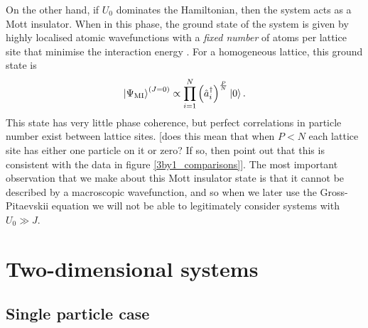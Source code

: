 \documentclass[a4paper, 10pt]{article}
\theoremstyle{plain}
\begin{document}
On the other hand, if $U_{0}$ dominates the Hamiltonian, then the
system acts as a Mott insulator. When in this phase, the
ground state of the system is given by highly localised atomic wavefunctions
with a \emph{fixed number} of atoms per lattice site that minimise the
interaction energy \cite{Bloch2005}. For a homogeneous lattice, this ground
state is
\begin{equation}
    \ket{\Psi_{\text{MI}}}^{\left(J=0\right)}
    \propto
    \prod_{i=1}^N \left( \hat{a}_i^\dagger \right)^\frac{P}{N}
    \ket{0}.
\end{equation}
This state has very little phase coherence, but perfect correlations in particle
number exist between lattice sites. [does this mean
that when $P<N$ each lattice site has either one particle on it or zero? If so,
then point out that this is consistent with the data in figure
\ref{3by1_comparisons}]. The most important observation that we make about this
Mott insulator state is that it cannot be described by a macroscopic
wavefunction, and so when we later use the Gross-Pitaevskii equation we will
not be able to legitimately consider systems with $U_{0} \gg J$.


\section{Two-dimensional systems\label{2Dsystems}}

\subsection{Single particle case\label{2DNoninteractingsection}}
\end{document}
